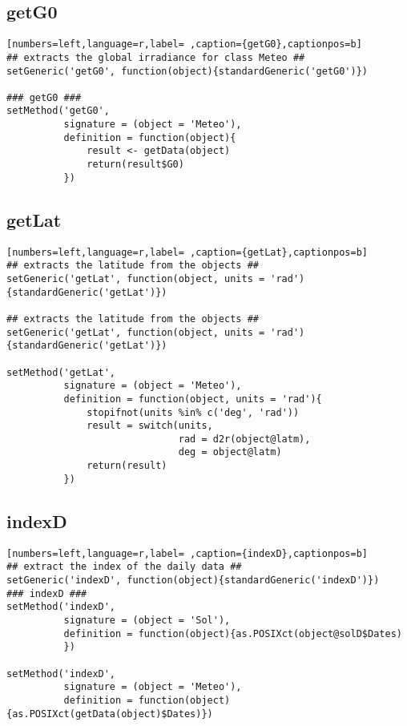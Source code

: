 \subsection{getG0}
\label{sec:orga49a9bf}
\begin{lstlisting}[numbers=left,language=r,label= ,caption={getG0},captionpos=b]
## extracts the global irradiance for class Meteo ##
setGeneric('getG0', function(object){standardGeneric('getG0')})

### getG0 ###
setMethod('getG0',
          signature = (object = 'Meteo'),
          definition = function(object){
              result <- getData(object)
              return(result$G0)
          })
\end{lstlisting}
\subsection{getLat}
\label{sec:org6441a4c}
\begin{lstlisting}[numbers=left,language=r,label= ,caption={getLat},captionpos=b]
## extracts the latitude from the objects ##
setGeneric('getLat', function(object, units = 'rad')
{standardGeneric('getLat')})

## extracts the latitude from the objects ##
setGeneric('getLat', function(object, units = 'rad')
{standardGeneric('getLat')})

setMethod('getLat',
          signature = (object = 'Meteo'),
          definition = function(object, units = 'rad'){
              stopifnot(units %in% c('deg', 'rad'))
              result = switch(units,
                              rad = d2r(object@latm),
                              deg = object@latm)
              return(result)
          })
\end{lstlisting}
\subsection{indexD}
\label{sec:orgfad7e28}
\begin{lstlisting}[numbers=left,language=r,label= ,caption={indexD},captionpos=b]
## extract the index of the daily data ##
setGeneric('indexD', function(object){standardGeneric('indexD')})
### indexD ###
setMethod('indexD',
          signature = (object = 'Sol'),
          definition = function(object){as.POSIXct(object@solD$Dates)
          })

setMethod('indexD',
          signature = (object = 'Meteo'),
          definition = function(object){as.POSIXct(getData(object)$Dates)})
\end{lstlisting}
